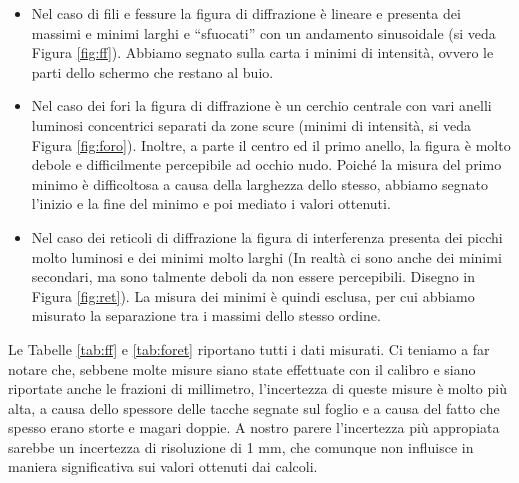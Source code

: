 \begin{itemize}
    \item{Nel caso di fili e fessure la figura di diffrazione è lineare e presenta dei massimi e minimi larghi e ``sfuocati'' con un andamento
        sinusoidale (si veda Figura \ref{fig:ff}). Abbiamo segnato sulla carta i minimi di intensità, ovvero le parti dello schermo
        che restano al buio.}
    \item{Nel caso dei fori la figura di diffrazione è un cerchio centrale con vari anelli luminosi concentrici separati da
        zone scure (minimi di intensità, si veda Figura \ref{fig:foro}). Inoltre, a parte il centro ed il primo anello,
        la figura è molto debole e difficilmente
        percepibile ad occhio nudo. Poiché la misura del primo minimo è difficoltosa a causa della larghezza dello stesso, abbiamo segnato
        l'inizio e la fine del minimo e poi mediato i valori ottenuti.}
    \item{Nel caso dei reticoli di diffrazione la figura di interferenza presenta dei picchi molto luminosi e dei minimi molto larghi
            (In realtà ci sono anche dei minimi secondari, ma sono talmente deboli da non essere percepibili. Disegno in Figura \ref{fig:ret}).
            La misura dei minimi è quindi esclusa, per cui abbiamo misurato la separazione tra i massimi dello stesso ordine.}
\end{itemize}

Le Tabelle \ref{tab:ff} e \ref{tab:foret} riportano tutti i dati misurati. Ci teniamo a far notare
che, sebbene molte misure siano state effettuate con il calibro e siano riportate anche le frazioni di millimetro,
l'incertezza di queste misure è molto più alta, a causa dello spessore delle tacche segnate sul foglio e a causa del
fatto che spesso erano storte e magari doppie. A nostro parere l'incertezza più appropiata sarebbe un incertezza di
risoluzione di 1 mm, che comunque non influisce in maniera significativa sui valori ottenuti dai calcoli.

